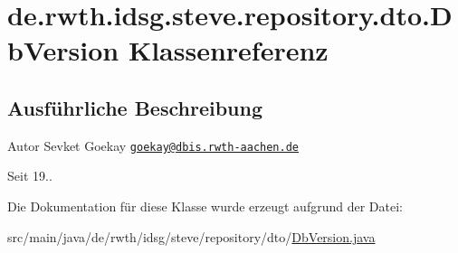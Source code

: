 \hypertarget{classde_1_1rwth_1_1idsg_1_1steve_1_1repository_1_1dto_1_1_db_version}{\section{de.\-rwth.\-idsg.\-steve.\-repository.\-dto.\-Db\-Version Klassenreferenz}
\label{classde_1_1rwth_1_1idsg_1_1steve_1_1repository_1_1dto_1_1_db_version}
}


\subsection{Ausführliche Beschreibung}
\begin{DoxyAuthor}{Autor}
Sevket Goekay \href{mailto:goekay@dbis.rwth-aachen.de}{\tt goekay@dbis.\-rwth-\/aachen.\-de} 
\end{DoxyAuthor}
\begin{DoxySince}{Seit}
19.. 
\end{DoxySince}


Die Dokumentation für diese Klasse wurde erzeugt aufgrund der Datei\-:\begin{DoxyCompactItemize}
\item 
src/main/java/de/rwth/idsg/steve/repository/dto/\hyperlink{_db_version_8java}{Db\-Version.\-java}\end{DoxyCompactItemize}
